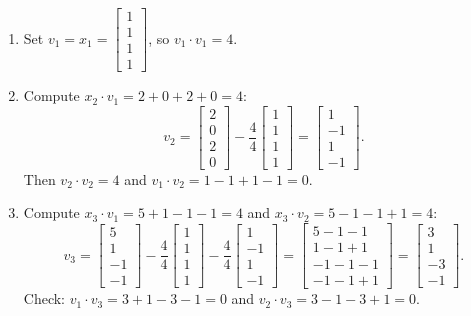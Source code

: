 \documentclass[11pt, letterpaper]{article}
\theoremstyle{definition}
\theoremstyle{remark}
\begin{document}
\begin{enumerate}[label=\textbf{Step \arabic*:}]
    \item Set $v_1 = x_1 = \begin{bmatrix} 1 \\ 1 \\ 1 \\ 1 \end{bmatrix}$, so $v_1 \cdot v_1 = 4$.
    \item Compute $x_2 \cdot v_1 = 2 + 0 + 2 + 0 = 4$:
    \[
        v_2 = \begin{bmatrix} 2 \\ 0 \\ 2 \\ 0 \end{bmatrix} - \frac{4}{4}\begin{bmatrix} 1 \\ 1 \\ 1 \\ 1 \end{bmatrix} = \begin{bmatrix} 1 \\ -1 \\ 1 \\ -1 \end{bmatrix}.
    \]
    Then $v_2 \cdot v_2 = 4$ and $v_1 \cdot v_2 = 1 - 1 + 1 - 1 = 0$.
    \item Compute $x_3 \cdot v_1 = 5 + 1 - 1 - 1 = 4$ and $x_3 \cdot v_2 = 5 - 1 - 1 + 1 = 4$:
    \[
        v_3 = \begin{bmatrix} 5 \\ 1 \\ -1 \\ -1 \end{bmatrix} - \frac{4}{4}\begin{bmatrix} 1 \\ 1 \\ 1 \\ 1 \end{bmatrix} - \frac{4}{4}\begin{bmatrix} 1 \\ -1 \\ 1 \\ -1 \end{bmatrix}
        = \begin{bmatrix} 5 - 1 - 1 \\ 1 - 1 + 1 \\ -1 - 1 - 1 \\ -1 - 1 + 1 \end{bmatrix}
        = \begin{bmatrix} 3 \\ 1 \\ -3 \\ -1 \end{bmatrix}.
    \]
    Check: $v_1 \cdot v_3 = 3 + 1 - 3 - 1 = 0$ and $v_2 \cdot v_3 = 3 - 1 - 3 + 1 = 0$.
\end{enumerate}
\end{document}
